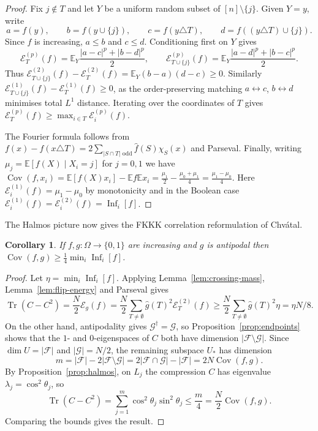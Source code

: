 \documentclass{article}
\theoremstyle{plain}
\newtheorem{cor}[theo]{Corollary}
\theoremstyle{definition}
\newcommand{\mc}[1]{\mathcal{#1}}
\newcommand{\mb}[1]{\mathbb{#1}}
\newcommand{\lra}{\leftrightarrow}
\newcommand{\sm}{\setminus}
\newcommand{\es}{\emptyset}
\newcommand{\cE}{\mathcal E}
\newcommand{\OO}{\Omega}
\newcommand{\on}{\operatorname}
\begin{document}
\begin{proof}
Fix $j\notin T$ and let $Y$ be a uniform random subset of $[n]\sm\{j\}$.  Given $Y=y$, write
\[
 a=f(y),\qquad b=f(y\cup\{j\}),\qquad
 c=f(y\triangle T),\qquad d=f((y\triangle T)\cup\{j\}).
\]
Since $f$ is increasing, $a\le b$ and $c\le d$.  Conditioning first on $Y$ gives
\[
 \cE_T^{(p)}(f)
 =\mb E_Y\frac{|a-c|^p+|b-d|^p}{2},\qquad
 \cE_{T\cup\{j\}}^{(p)}(f)
 =\mb E_Y\frac{|a-d|^p+|b-c|^p}{2}.
\]
Thus $\cE_{T\cup\{j\}}^{(2)}(f)-\cE_T^{(2)}(f) = \mb{E}_Y (b-a)(d-c) \ge 0$.
Similarly $\cE_{T\cup\{j\}}^{(1)}(f)-\cE_T^{(1)}(f) \ge0$, as the order-preserving
matching $a \lra c$, $b \lra d$ minimises total $L^1$ distance.
Iterating over the coordinates of $T$ gives $\cE_T^{(p)}(f)\ge\max_{i\in T}\cE_i^{(p)}(f)$.

The Fourier formula follows from
\(
 f(x)-f(x\triangle T)
 =2\sum_{|S\cap T|\text{ odd}}\widehat f(S)\chi_S(x)
\)
and Parseval.
Finally, writing $\mu_j=\mb E[f(X)\mid X_i=j]$ for $j=0,1$
we have  $\on{Cov}(f,x_i)= \mb E[f(X)x_i]-\mb E f\mb E x_i
= \frac{\mu_1}{2} - \frac{\mu_0+\mu_1}{4}
= \frac{\mu_1-\mu_0}{4}$.
Here $\cE_i^{(1)}(f)=\mu_1-\mu_0$ by monotonicity
and in the Boolean case $\cE_i^{(1)}(f)=\cE_i^{(2)}(f)=\on{Inf}_i[f]$.
\end{proof}

The Halmos picture now gives the FKKK correlation reformulation of Chv\'atal.

\begin{cor}\label{cor:antipodal}
If $f,g:\OO\to\{0,1\}$ are increasing and $g$ is antipodal then $\on{Cov}(f,g)\ge\frac14\min_i\on{Inf}_i[f]$.
\end{cor}

\begin{proof}
Let $\eta=\min_i\on{Inf}_i[f]$. Applying Lemma~\ref{lem:crossing-mass}, Lemma~\ref{lem:flip-energy} and Parseval gives
\[
 \on{Tr}(C-C^2)=\frac N2\mc E_g(f)
 =\frac N2\sum_{T\ne\es}\widehat g(T)^2\cE_T^{(2)}(f) 
 \ge \frac N2\sum_{T\ne\es}\widehat g(T)^2 \eta = \eta N/8.
\]
On the other hand, antipodality gives $\mc G^\dagger=\mc G$, so Proposition~\ref{prop:endpoints} 
shows that the $1$- and $0$-eigenspaces of $C$ both have dimension $|\mc F\sm\mc G|$.  
Since $\dim U=|\mc F|$ and $|\mc G|=N/2$, the remaining subspace $U_*$ has dimension
\[
 m=|\mc F|-2|\mc F\sm\mc G|
 =2|\mc F\cap\mc G|-|\mc F|
 =2N\on{Cov}(f,g).
\]
By Proposition~\ref{prop:halmos}, 
on $L_j$ the compression $C$ has eigenvalue $\lambda_j=\cos^2\theta_j$, so 
\[
 \on{Tr}(C-C^2)=\sum_{j=1}^m\cos^2\theta_j\sin^2\theta_j
 \le\frac m4=\frac N2\on{Cov}(f,g).
\]
Comparing the bounds gives the result.
\end{proof}
\end{document}
